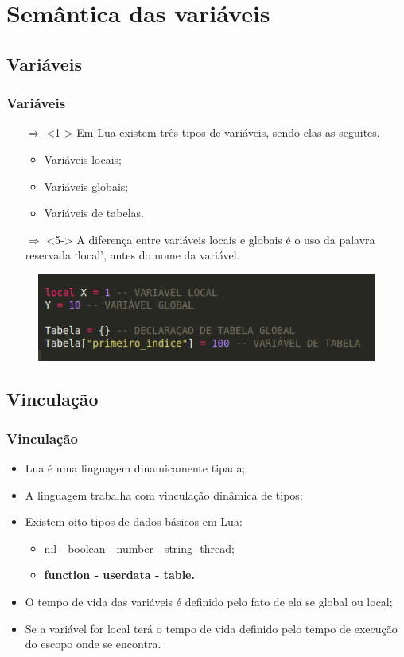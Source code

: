 \documentclass{beamer}
\begin{document}
\section{Semântica das variáveis}
\subsection{Variáveis}
\begin{frame}[fragile]
\frametitle{Variáveis}
	\begin{itemize}
	\item [$\Rightarrow$]<1-> Em Lua existem três tipos de variáveis, sendo elas as seguites.
	\begin{itemize}
		\item <2-> Variáveis locais;
		\item <3-> Variáveis globais;
		\item <4-> Variáveis de tabelas.
	\end{itemize}
	\item [$\Rightarrow$]<5-> A diferença entre variáveis locais e globais é o uso da palavra reservada ‘local’, antes do nome da variável.
	\end{itemize}
	\begin{figure}[!htb]
		\centering
		\includegraphics[width=0.7\linewidth]{imagens/variaveis}
	\end{figure}
\end{frame}

\subsection{Vinculação}
\begin{frame}[fragile]
\frametitle{Vinculação}
	\begin{itemize}
	\item<1-> Lua é uma linguagem dinamicamente tipada; 
	\item<2-> A linguagem trabalha com vinculação dinâmica de tipos;
	\item<3-> Existem oito tipos de dados básicos em Lua:
	\begin{itemize}
		\item<4-> nil - boolean - number - string- thread;
		\item<5-> \textbf{function - userdata - table.}
	\end{itemize}
	\item<6-> O tempo de vida das variáveis é definido pelo fato de ela se global ou local;
	\item<7-> Se a variável for local terá o tempo de vida definido pelo tempo de execução do escopo onde se encontra.
	\end{itemize}
\end{frame}
\end{document}
